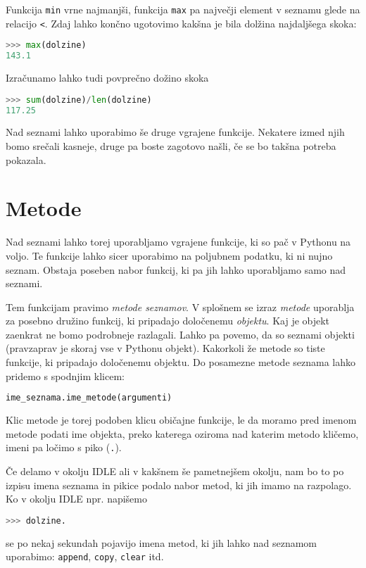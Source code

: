 Funkcija \texttt{min} vrne najmanjši, funkcija \texttt{max} pa največji element v seznamu glede na relacijo \texttt{<}. Zdaj lahko končno ugotovimo kakšna je bila dolžina najdaljšega skoka:
\begin{lstlisting}[language=Python, showstringspaces=false]
>>> max(dolzine)
143.1
\end{lstlisting}

Izračunamo lahko tudi povprečno dožino skoka
\begin{lstlisting}[language=Python, showstringspaces=false]
>>> sum(dolzine)/len(dolzine)
117.25
\end{lstlisting}
Nad seznami lahko uporabimo še druge vgrajene funkcije. Nekatere izmed njih bomo srečali kasneje, druge pa boste zagotovo našli, če se bo takšna potreba pokazala. 

\section{Metode}

Nad seznami lahko torej uporabljamo vgrajene funkcije, ki so pač v Pythonu na voljo. Te funkcije lahko sicer uporabimo na poljubnem podatku, ki ni nujno seznam. Obstaja poseben nabor funkcij, ki pa jih lahko uporabljamo samo nad seznami. 

Tem funkcijam pravimo \emph{metode seznamov}. V splošnem se izraz \emph{metode} uporablja za posebno družino funkcij, ki pripadajo določenemu \emph{objektu}. Kaj je objekt zaenkrat ne bomo podrobneje razlagali. Lahko pa povemo, da so seznami objekti (pravzaprav je skoraj vse v Pythonu objekt). Kakorkoli že metode so tiste funkcije, ki pripadajo določenemu objektu. Do posamezne metode seznama lahko pridemo s spodnjim klicem:
\begin{lstlisting}[language=Python, showstringspaces=false]
ime_seznama.ime_metode(argumenti)
\end{lstlisting}
Klic metode je torej podoben klicu običajne funkcije, le da moramo pred imenom metode podati ime objekta, preko katerega oziroma nad katerim metodo kličemo, imeni pa ločimo s piko (\texttt{.}).

Če delamo v okolju IDLE ali v kakšnem še pametnejšem okolju, nam bo to po izpisu imena seznama in pikice podalo nabor metod, ki jih imamo na razpolago. Ko v okolju IDLE npr. napišemo
\begin{lstlisting}[language=Python, showstringspaces=false]
>>> dolzine.
\end{lstlisting}
se po nekaj sekundah pojavijo imena metod, ki jih lahko nad seznamom uporabimo: \texttt{append}, \texttt{copy}, \texttt{clear} itd.


